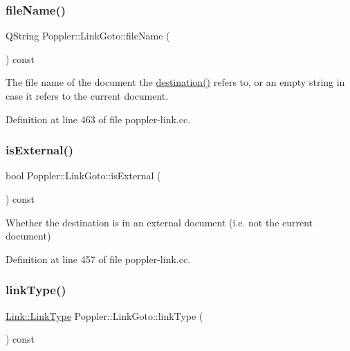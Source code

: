 \subsubsection{\texorpdfstring{file\+Name()}{fileName()}}
{\footnotesize\ttfamily Q\+String Poppler\+::\+Link\+Goto\+::file\+Name (\begin{DoxyParamCaption}{ }\end{DoxyParamCaption}) const}

The file name of the document the \hyperlink{class_poppler_1_1_link_goto_aa09835c861c3c0ef32555c25f6325a22}{destination()} refers to, or an empty string in case it refers to the current document. 

Definition at line 463 of file poppler-\/link.\+cc.

\mbox{\label{class_poppler_1_1_link_goto_a892497a8afa41fdafca1573f6dc6e9c7}} 
\subsubsection{\texorpdfstring{is\+External()}{isExternal()}}
{\footnotesize\ttfamily bool Poppler\+::\+Link\+Goto\+::is\+External (\begin{DoxyParamCaption}{ }\end{DoxyParamCaption}) const}

Whether the destination is in an external document (i.\+e. not the current document) 

Definition at line 457 of file poppler-\/link.\+cc.

\mbox{\label{class_poppler_1_1_link_goto_a4060fbbbe4ebcb4bd55e737659b55092}} 
\subsubsection{\texorpdfstring{link\+Type()}{linkType()}}
{\footnotesize\ttfamily \hyperlink{class_poppler_1_1_link_af0dacfa77a548bb043dbae4bb9dc6c1e}{Link\+::\+Link\+Type} Poppler\+::\+Link\+Goto\+::link\+Type (\begin{DoxyParamCaption}{ }\end{DoxyParamCaption}) const\hspace{0.3cm}{\ttfamily [virtual]}}

